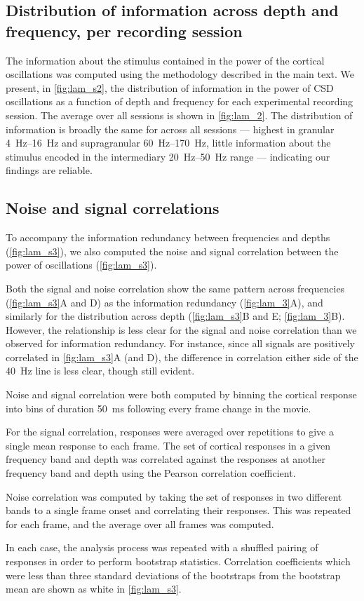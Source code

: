 \subsection{Distribution of information across depth and frequency, per recording session}

The information about the stimulus contained in the power of the cortical oscillations was computed using the methodology described in the main text.
We present, in \autoref{fig:lam_s2}, the distribution of information in the power of \ac{CSD} oscillations as a function of depth and frequency for each experimental recording session.
The average over all sessions is shown in \autoref{fig:lam_2}.
The distribution of information is broadly the same for across all sessions --- highest in granular \SIrange{4}{16}{Hz} and supragranular \SIrange{60}{170}{Hz}, little information about the stimulus encoded in the intermediary \SIrange{20}{50}{Hz} range --- indicating our findings are reliable.


\subsection{Noise and signal correlations}

To accompany the information redundancy between frequencies and depths (\autoref{fig:lam_s3}), we also computed the noise and signal correlation between the power of oscillations (\autoref{fig:lam_s3}).

Both the signal and noise correlation show the same pattern across frequencies (\autoref{fig:lam_s3}A and D) as the information redundancy (\autoref{fig:lam_3}A), and similarly for the distribution across depth (\autoref{fig:lam_s3}B and E; \autoref{fig:lam_3}B).
However, the relationship is less clear for the signal and noise correlation than we observed for information redundancy.
For instance, since all signals are positively correlated in \autoref{fig:lam_s3}A (and D), the difference in correlation either side of the \SI{40}{Hz} line is less clear, though still evident.

Noise and signal correlation were both computed by binning the cortical response into bins of duration \SI{50}{\milli\second} following every frame change in the movie.

For the signal correlation, responses were averaged over repetitions to give a single mean response to each frame.
The set of cortical responses in a given frequency band and depth was correlated against the responses at another frequency band and depth using the Pearson correlation coefficient.

Noise correlation was computed by taking the set of responses in two different bands to a single frame onset and correlating their responses.
This was repeated for each frame, and the average over all frames was computed.

In each case, the analysis process was repeated with a shuffled pairing of responses in order to perform bootstrap statistics.
Correlation coefficients which were less than three standard deviations of the bootstraps from the bootstrap mean are shown as white in \autoref{fig:lam_s3}.
